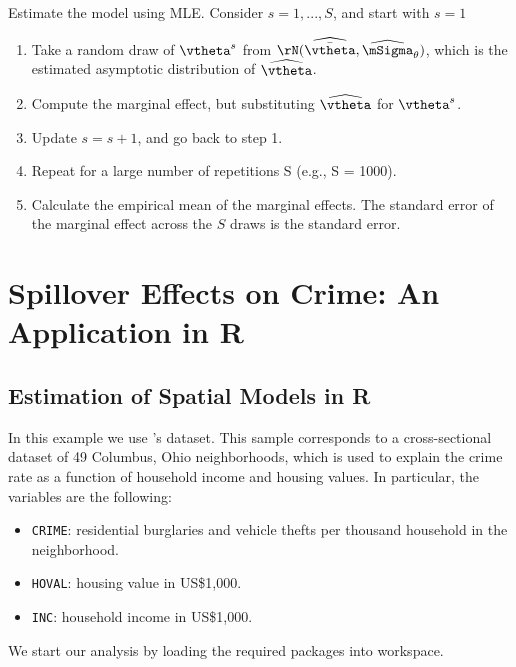 \documentclass[english,12pt]{book}\usepackage[]{graphicx}\usepackage[]{xcolor}
\begin{document}
\begin{algorithm}
Estimate the model using MLE. Consider $s = 1, ..., S$, and start with $s = 1$
\begin{enumerate}
  \item Take a random draw of $\vtheta^{s}$ from $\rN(\widehat{\bar{\vtheta}}, \widehat{\mSigma}_{\theta})$, which is the estimated asymptotic distribution of $\widehat{\vtheta}$. 
 \item Compute the marginal effect, but substituting  $\widehat{\vtheta}$ for $\vtheta^s$. 
 \item Update $s = s + 1$, and go back to step 1. 
 \item Repeat for a large number of repetitions S (e.g., S = 1000).  
 \item Calculate the empirical mean of the marginal effects. The standard error of the marginal effect across the $S$ draws is the standard error. 
\end{enumerate}
\end{algorithm}


\section{Spillover Effects on Crime: An Application in R}\label{sec:Anselin-example}


\subsection{Estimation of Spatial Models in R}

In this example we use \cite{anselin1988spatial}'s dataset. This sample corresponds to a cross-sectional dataset of 49 Columbus, Ohio neighborhoods, which is used to explain the crime rate as  a function of household income and housing values. In particular, the variables  are the following:

\begin{itemize}
  \item \texttt{CRIME}: residential burglaries and vehicle thefts per thousand household in the neighborhood.
  \item \texttt{HOVAL}: housing value in US\$1,000.
  \item \texttt{INC}: household income in US\$1,000.
\end{itemize}

We start our analysis by loading the required packages into  workspace.
\end{document}
